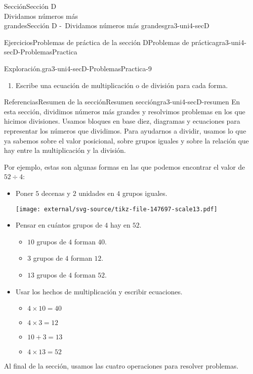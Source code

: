 \begin{sectionptx}{Sección}{{\Large Sección D\\}Dividamos números más\\grandes}{}{Sección D -~Dividamos números más grandes}{}{}{gra3-uni4-secD}
\begin{exercises-subsection}{Ejercicios}{Problemas de práctica de la sección D}{}{Problemas de práctica}{}{}{gra3-uni4-secD-ProblemasPractica}
\begin{divisionexercise}{7}{Exploración.}{}{gra3-uni4-secD-ProblemasPractica-9}
\begin{enumerate}[label={(\alph*)}]
\item{}Escribe una ecuación de multiplicación o de división para cada forma.%
\end{enumerate}
\end{divisionexercise}%
\end{exercises-subsection}
%
%
\typeout{************************************************}
\typeout{************************************************}
%
\clearpage
\begin{references-subsection}{Referencias}{Resumen de la sección}{}{Resumen sección}{}{}{gra3-uni4-secD-resumen}
En esta sección, dividimos números más grandes y resolvimos problemas en los que hicimos divisiones. Usamos bloques en base diez, diagramas y ecuaciones para representar los números que dividimos. Para ayudarnos a dividir, usamos lo que ya sabemos sobre el valor posicional, sobre grupos iguales y sobre la relación que hay entre la multiplicación y la división.%
\par
Por ejemplo, estas son algunas formas en las que podemos encontrar el valor de \(52 \div 4\):%
%
\begin{itemize}[label=\textbullet]
\item{}Poner \(5\) decenas y \(2\) unidades en \(4\) grupos iguales.%
\begin{image}{0}{1}{0}{}%
\texttt{[image: external/svg-source/tikz-file-147697-scale13.pdf]}
\end{image}%
\item{}Pensar en cuántos grupos de \(4\) hay en \(52\).%
%
\begin{itemize}[label=$\circ$]
\item{}\(10\) grupos de \(4\) forman \(40\).%
\item{}\(3\) grupos de \(4\) forman \(12\).%
\item{}\(13\) grupos de \(4\) forman \(52\).%
\end{itemize}
\item{}Usar los hechos de multiplicación y escribir ecuaciones.%
%
\begin{itemize}[label=$\circ$]
\item{}\(\displaystyle 4 \times 10 = 40\)%
\item{}\(\displaystyle 4 \times 3 = 12\)%
\item{}\(\displaystyle 10 + 3 = 13\)%
\item{}\(\displaystyle 4 \times 13 = 52\)%
\end{itemize}
\end{itemize}
Al final de la sección, usamos las cuatro operaciones para resolver problemas.%
\end{references-subsection}
\end{sectionptx}
